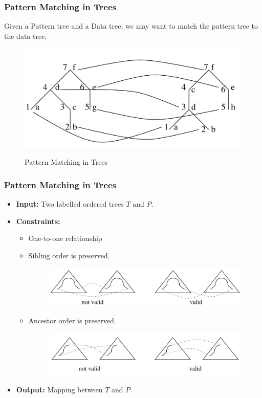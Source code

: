 \documentclass{beamer}
\begin{document}
\begin{frame}
\frametitle{Pattern Matching in Trees}
Given a Pattern tree and a Data tree, we may want to match the pattern tree to the data tree.  
\begin{figure}
	\includegraphics[width=0.6\linewidth]{PatternMatchingInTrees}
	\label{Pattern Matching in Trees} 
	\caption{Pattern Matching in Trees}
	\centering
\end{figure}
\end{frame}


\begin{frame}
\frametitle{Pattern Matching in Trees}
\begin{itemize}
\item \textbf{Input:}
Two labelled ordered trees $T$ and $P$.
\item \textbf{Constraints: }
\begin{itemize}
\item One-to-one relationship
\item Sibling order is preserved.
\begin{figure}
	\includegraphics[width=1.0\linewidth]{SiblingOrderPreserved}
	\label{Sibling Order is Preserved} 
	\centering
\end{figure}
\item Ancestor order is preserved.
\begin{figure}
	\includegraphics[width=1.0\linewidth]{AncestorOrderPreserved}
	\label{Ancestor Order is Preserved} 
	\centering
\end{figure}
\end{itemize}
\item \textbf{Output:}
Mapping between $T$ and $P$. 
\end{itemize}
\end{frame}
\end{document}
